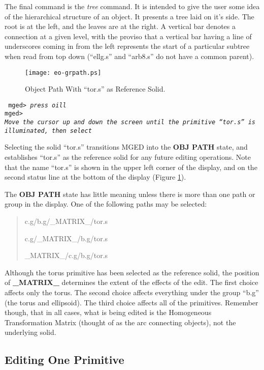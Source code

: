 The final command is the {\em tree} command.  It is intended to give the
user some idea of the hierarchical structure of an object.  It presents
a tree laid on it's side.  The root is at the left, and the leaves are
at the right. A vertical bar denotes a connection at a given level, with
the proviso that a vertical bar having a line of underscores coming
in from the left represents the start of a particular subtree when read
from top down (``ellg.s'' and ``arb8.s'' do not have a common parent).

\begin{figure}
\centering \texttt{[image: eo-grpath.ps]}
\caption{Object Path With ``tor.s'' as Reference Solid.}
\label{eo-grpath}
\end{figure}

\noindent
{\tt
mged> {\em press oill}\\
mged>\\
{\em Move the cursor up and down the screen until the primitive ``tor.s''
is illuminated, then select}\\
}

Selecting the solid ``tor.s'' transitions MGED into the {\bf OBJ PATH}
state, and establishes ``tor.s'' as the reference solid for any future
editing operations.
Note that the name ``tor.s'' is shown in the upper left corner of the
display, and on the second status line at the bottom of the display
(Figure \ref{eo-grpath}).

The {\bf OBJ PATH} state has little meaning unless there is more than one path
or group in the display.  One of the following paths may be selected:

\begin{quote}
c.g/b.g/\_MATRIX\_/tor.s

c.g/\_MATRIX\_/b.g/tor.s

\_MATRIX\_/c.g/b.g/tor.s
\end{quote}

Although the torus primitive has been selected as the reference solid,
the position of {\bf \_MATRIX\_} determines the extent of the effects of
the edit.  The first choice affects only the torus.  The second choice
affects everything under the group ``b.g'' (the torus and ellipsoid).
The third choice affects all of the primitives.  Remember though, that
in all cases, what is being edited is the Homogeneous Transformation
Matrix (thought of as the arc connecting objects), not the underlying
solid.

\subsection{Editing One Primitive}

